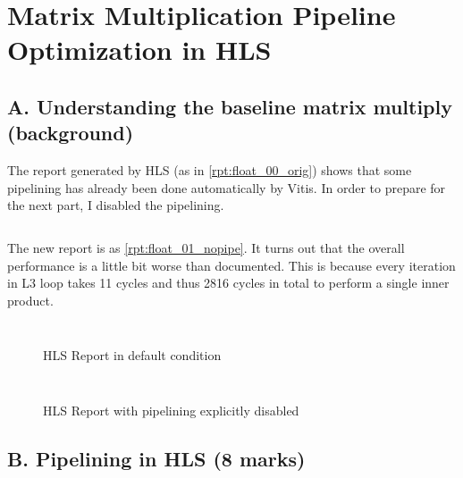 \section{Matrix Multiplication Pipeline Optimization in HLS}

\subsection{A. Understanding the baseline matrix multiply (background)}

The report generated by HLS (as in \autoref{rpt:float_00_orig}) shows that
some pipelining has already been done automatically by Vitis.
In order to prepare for the next part,
I disabled the pipelining.

\inputminted{diff}{program/float_nopipe.diff}

The new report is as \autoref{rpt:float_01_nopipe}.
It turns out that the overall performance is a little bit worse than documented.
This is because every iteration in L3 loop takes 11 cycles and thus
2816 cycles in total to perform a single inner product.


\begin{figure}
    {
        \inputminted[firstline=25,lastline=48]{text}{report/float_00_orig.rpt}
    }
    {
        \inputminted[firstline=55,lastline=84]{text}{report/float_00_orig.rpt}
    }
    \caption{HLS Report in default condition}
    \label{rpt:float_00_orig}
\end{figure}


\begin{figure}
    {
        \inputminted[firstline=25,lastline=52]{text}{report/float_01_nopipe.rpt}
    }
    {
        \inputminted[firstline=59,lastline=88]{text}{report/float_01_nopipe.rpt}
    }

    \caption{HLS Report with pipelining explicitly disabled}
    \label{rpt:float_01_nopipe}
\end{figure}

\subsection{B. Pipelining in HLS (8 marks)}

